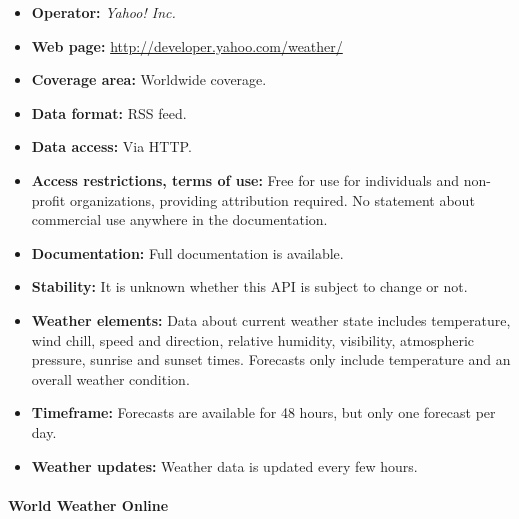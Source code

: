 \begin{itemize}
  \item \textbf{Operator:} \emph{Yahoo! Inc.}
  \item \textbf{Web page:} \href{http://developer.yahoo.com/weather/}{http://developer.yahoo.com/weather/}
  \item \textbf{Coverage area:} Worldwide coverage.
  \item \textbf{Data format:} RSS feed.
  \item \textbf{Data access:} Via HTTP.
  \item \textbf{Access restrictions, terms of use:} Free for use for individuals and non-profit organizations, providing attribution required. No statement about commercial use anywhere in the documentation.
  \item \textbf{Documentation:} Full documentation is available.
  \item \textbf{Stability:} It is unknown whether this API is subject to change or not.
  \item \textbf{Weather elements:} Data about current weather state includes temperature, wind chill, speed and direction, relative humidity, visibility, atmospheric pressure, sunrise and sunset times. Forecasts only include temperature and an overall weather condition.
  \item \textbf{Timeframe:} Forecasts are available for 48 hours, but only one forecast per day.
  \item \textbf{Weather updates:} Weather data is updated every few hours.
\end{itemize}

\paragraph{World Weather Online}

